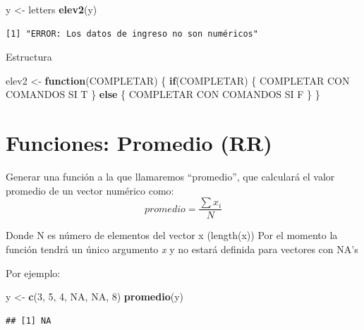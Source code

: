 \documentclass[]{book}
\newenvironment{Shaded}{\begin{snugshade}}{\end{snugshade}}
\newcommand{\ControlFlowTok}[1]{\textcolor[rgb]{0.13,0.29,0.53}{\textbf{#1}}}
\newcommand{\DecValTok}[1]{\textcolor[rgb]{0.00,0.00,0.81}{#1}}
\newcommand{\KeywordTok}[1]{\textcolor[rgb]{0.13,0.29,0.53}{\textbf{#1}}}
\newcommand{\NormalTok}[1]{#1}
\newcommand{\OtherTok}[1]{\textcolor[rgb]{0.56,0.35,0.01}{#1}}
\newcommand{\StringTok}[1]{\textcolor[rgb]{0.31,0.60,0.02}{#1}}
\begin{document}
\begin{Shaded}
\begin{Highlighting}[]
\NormalTok{  y <-}\StringTok{ }\NormalTok{letters}
  \KeywordTok{elev2}\NormalTok{(y)}
\end{Highlighting}
\end{Shaded}

\begin{verbatim}
[1] "ERROR: Los datos de ingreso no son numéricos"
\end{verbatim}

Estructura

\begin{Shaded}
\begin{Highlighting}[]
\NormalTok{elev2 <-}\StringTok{ }\ControlFlowTok{function}\NormalTok{(COMPLETAR) \{}
      \ControlFlowTok{if}\NormalTok{(COMPLETAR) \{}
\NormalTok{        COMPLETAR CON COMANDOS SI T}
\NormalTok{        \} }\ControlFlowTok{else}\NormalTok{ \{}
\NormalTok{        COMPLETAR CON COMANDOS SI F}
\NormalTok{       \}}
\NormalTok{    \}}
\end{Highlighting}
\end{Shaded}

\hypertarget{funciones-promedio-rr}{%
\section{Funciones: Promedio (RR)}\label{funciones-promedio-rr}}

Generar una función a la que llamaremos ``promedio'', que calculará el valor promedio de un vector numérico como:\\
\[promedio = \frac{\sum x_{i}}{N}\]

Donde N es número de elementos del vector x (length(x))
Por el momento la función tendrá un único argumento \emph{x} y no estará definida para vectores con NA's

Por ejemplo:

\begin{Shaded}
\begin{Highlighting}[]
\NormalTok{y <-}\StringTok{ }\KeywordTok{c}\NormalTok{(}\DecValTok{3}\NormalTok{, }\DecValTok{5}\NormalTok{, }\DecValTok{4}\NormalTok{, }\OtherTok{NA}\NormalTok{, }\OtherTok{NA}\NormalTok{, }\DecValTok{8}\NormalTok{)}
\KeywordTok{promedio}\NormalTok{(y)}
\end{Highlighting}
\end{Shaded}

\begin{verbatim}
## [1] NA
\end{verbatim}
\end{document}
